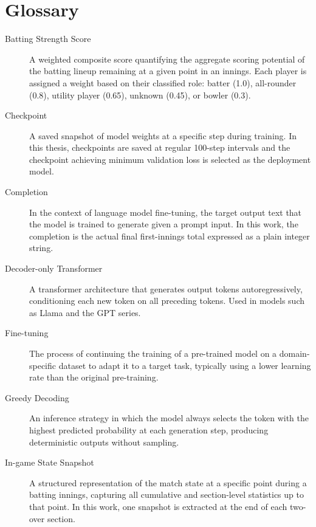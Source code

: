 \chapter*{Glossary}

\begin{description}

    \item[Batting Strength Score]
    A weighted composite score quantifying the aggregate scoring potential of the batting lineup remaining at a given point in an innings. Each player is assigned a weight based on their classified role: batter (1.0), all-rounder (0.8), utility player (0.65), unknown (0.45), or bowler (0.3).

    \item[Checkpoint]
    A saved snapshot of model weights at a specific step during training. In this thesis, checkpoints are saved at regular 100-step intervals and the checkpoint achieving minimum validation loss is selected as the deployment model.

    \item[Completion]
    In the context of language model fine-tuning, the target output text that the model is trained to generate given a prompt input. In this work, the completion is the actual final first-innings total expressed as a plain integer string.

    \item[Decoder-only Transformer]
    A transformer architecture that generates output tokens autoregressively, conditioning each new token on all preceding tokens. Used in models such as Llama and the GPT series.

    \item[Fine-tuning]
    The process of continuing the training of a pre-trained model on a domain-specific dataset to adapt it to a target task, typically using a lower learning rate than the original pre-training.

    \item[Greedy Decoding]
    An inference strategy in which the model always selects the token with the highest predicted probability at each generation step, producing deterministic outputs without sampling.

    \item[In-game State Snapshot]
    A structured representation of the match state at a specific point during a batting innings, capturing all cumulative and section-level statistics up to that point. In this work, one snapshot is extracted at the end of each two-over section.


\end{description}
